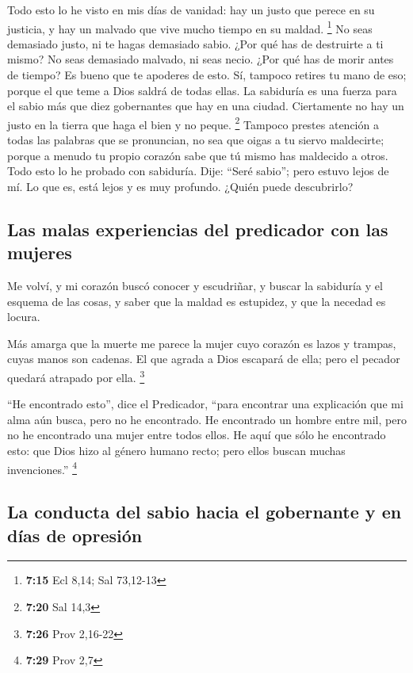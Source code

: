  Todo esto lo he visto en mis días de vanidad: hay un
justo que perece en su justicia, y hay un malvado que vive mucho tiempo
en su maldad. \footnote{\textbf{7:15} Ecl 8,14; Sal 73,12-13}
 No seas demasiado justo, ni te hagas demasiado sabio.
¿Por qué has de destruirte a ti mismo?  No seas demasiado
malvado, ni seas necio. ¿Por qué has de morir antes de tiempo?
 Es bueno que te apoderes de esto. Sí, tampoco retires tu
mano de eso; porque el que teme a Dios saldrá de todas ellas.
 La sabiduría es una fuerza para el sabio más que diez
gobernantes que hay en una ciudad.  Ciertamente no hay un
justo en la tierra que haga el bien y no peque. \footnote{\textbf{7:20}
  Sal 14,3}  Tampoco prestes atención a todas las
palabras que se pronuncian, no sea que oigas a tu siervo maldecirte;
 porque a menudo tu propio corazón sabe que tú mismo has
maldecido a otros.  Todo esto lo he probado con
sabiduría. Dije: ``Seré sabio''; pero estuvo lejos de mí.
 Lo que es, está lejos y es muy profundo. ¿Quién puede
descubrirlo?

\hypertarget{las-malas-experiencias-del-predicador-con-las-mujeres}{%
\subsection{Las malas experiencias del predicador con las
mujeres}\label{las-malas-experiencias-del-predicador-con-las-mujeres}}

 Me volví, y mi corazón buscó conocer y escudriñar, y
buscar la sabiduría y el esquema de las cosas, y saber que la maldad es
estupidez, y que la necedad es locura.

 Más amarga que la muerte me parece la mujer cuyo corazón
es lazos y trampas, cuyas manos son cadenas. El que agrada a Dios
escapará de ella; pero el pecador quedará atrapado por ella. \footnote{\textbf{7:26}
  Prov 2,16-22}

 ``He encontrado esto'', dice el Predicador, ``para
encontrar una explicación  que mi alma aún busca, pero no
he encontrado. He encontrado un hombre entre mil, pero no he encontrado
una mujer entre todos ellos.  He aquí que sólo he
encontrado esto: que Dios hizo al género humano recto; pero ellos buscan
muchas invenciones.'' \footnote{\textbf{7:29} Prov 2,7}

\hypertarget{la-conducta-del-sabio-hacia-el-gobernante-y-en-duxedas-de-opresiuxf3n}{%
\subsection{La conducta del sabio hacia el gobernante y en días de
opresión}\label{la-conducta-del-sabio-hacia-el-gobernante-y-en-duxedas-de-opresiuxf3n}}

